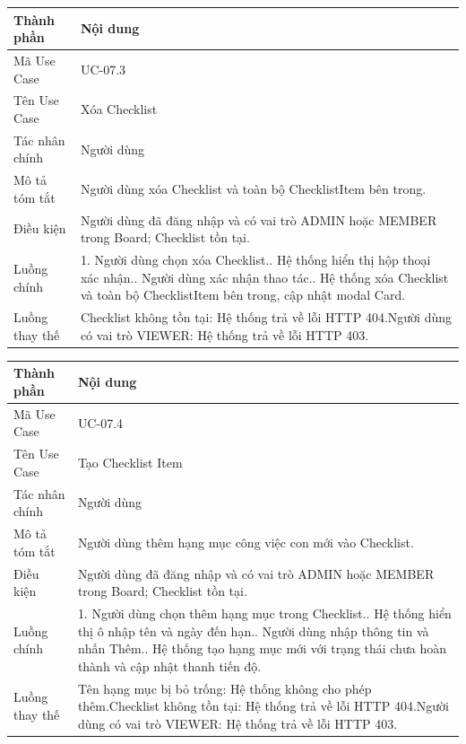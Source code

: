 \vspace{0.5cm}
\noindent\begin{tabular}{|p{3.5cm}|p{10.5cm}|}
\hline
\textbf{Thành phần} & \textbf{Nội dung} \\
\hline
Mã Use Case & UC-07.3 \\
\hline
Tên Use Case & Xóa Checklist \\
\hline
Tác nhân chính & Người dùng \\
\hline
Mô tả tóm tắt & Người dùng xóa Checklist và toàn bộ ChecklistItem bên trong. \\
\hline
Điều kiện & Người dùng đã đăng nhập và có vai trò ADMIN hoặc MEMBER trong Board; Checklist tồn tại. \\
\hline
Luồng chính & 1. Người dùng chọn xóa Checklist.\newline 2. Hệ thống hiển thị hộp thoại xác nhận.\newline 3. Người dùng xác nhận thao tác.\newline 4. Hệ thống xóa Checklist và toàn bộ ChecklistItem bên trong, cập nhật modal Card. \\
\hline
Luồng thay thế & Checklist không tồn tại: Hệ thống trả về lỗi HTTP 404.\newline Người dùng có vai trò VIEWER: Hệ thống trả về lỗi HTTP 403. \\
\hline
\end{tabular}

\vspace{0.5cm}
\noindent\begin{tabular}{|p{3.5cm}|p{10.5cm}|}
\hline
\textbf{Thành phần} & \textbf{Nội dung} \\
\hline
Mã Use Case & UC-07.4 \\
\hline
Tên Use Case & Tạo Checklist Item \\
\hline
Tác nhân chính & Người dùng \\
\hline
Mô tả tóm tắt & Người dùng thêm hạng mục công việc con mới vào Checklist. \\
\hline
Điều kiện & Người dùng đã đăng nhập và có vai trò ADMIN hoặc MEMBER trong Board; Checklist tồn tại. \\
\hline
Luồng chính & 1. Người dùng chọn thêm hạng mục trong Checklist.\newline 2. Hệ thống hiển thị ô nhập tên và ngày đến hạn.\newline 3. Người dùng nhập thông tin và nhấn Thêm.\newline 4. Hệ thống tạo hạng mục mới với trạng thái chưa hoàn thành và cập nhật thanh tiến độ. \\
\hline
Luồng thay thế & Tên hạng mục bị bỏ trống: Hệ thống không cho phép thêm.\newline Checklist không tồn tại: Hệ thống trả về lỗi HTTP 404.\newline Người dùng có vai trò VIEWER: Hệ thống trả về lỗi HTTP 403. \\
\hline
\end{tabular}

